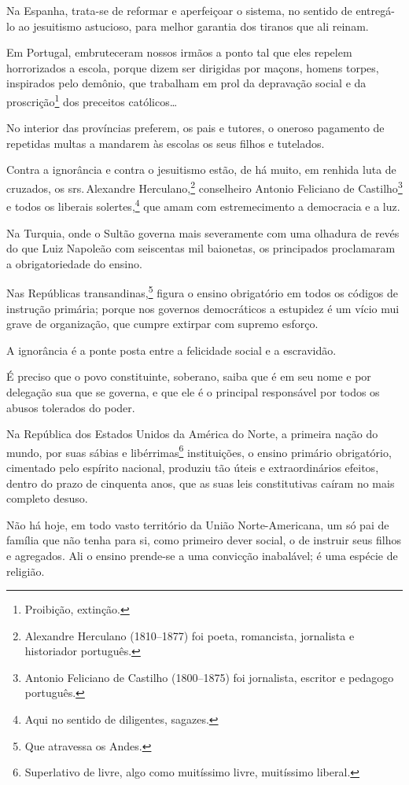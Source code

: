 Na Espanha, trata-se de reformar e aperfeiçoar o sistema, no sentido de
entregá-lo ao jesuitismo astucioso, para melhor garantia dos tiranos que
ali reinam.

Em Portugal, embruteceram nossos irmãos a ponto tal que eles repelem
horrorizados a escola, porque dizem ser dirigidas por maçons, homens
torpes, inspirados pelo demônio, que trabalham em prol da depravação
social e da proscrição\footnote{Proibição, extinção.} dos preceitos
católicos\ldots

No interior das províncias preferem, os pais e tutores, o oneroso
pagamento de repetidas multas a mandarem às escolas os seus filhos e
tutelados.

Contra a ignorância e contra o jesuitismo estão, de há muito, em renhida
luta de cruzados, os srs.\,Alexandre Herculano,\footnote{Alexandre
  Herculano (1810--1877) foi poeta, romancista, jornalista e historiador
  português.} conselheiro Antonio Feliciano de Castilho\footnote{
  Antonio Feliciano de Castilho (1800--1875) foi jornalista, escritor e
  pedagogo português.} e todos os liberais solertes,\footnote{Aqui no
  sentido de diligentes, sagazes.} que amam com estremecimento a
democracia e a luz.

Na Turquia, onde o Sultão governa mais severamente com uma olhadura de
revés do que Luiz Napoleão com seiscentas mil baionetas, os principados
proclamaram a obrigatoriedade do ensino.

Nas Repúblicas transandinas,\footnote{Que atravessa os Andes.} figura
o ensino obrigatório em todos os códigos de instrução primária; porque
nos governos democráticos a estupidez é um vício mui grave de
organização, que cumpre extirpar com supremo esforço.

A ignorância é a ponte posta entre a felicidade social e a escravidão.

É preciso que o povo constituinte, soberano, saiba que é em seu nome e
por delegação sua que se governa, e que ele é o principal responsável
por todos os abusos tolerados do poder.

Na República dos Estados Unidos da América do Norte, a primeira nação do
mundo, por suas sábias e libérrimas\footnote{Superlativo de livre,
  algo como muitíssimo livre, muitíssimo liberal.} instituições, o
ensino primário obrigatório, cimentado pelo espírito nacional, produziu
tão úteis e extraordinários efeitos, dentro do prazo de cinquenta anos,
que as suas leis constitutivas caíram no mais completo desuso.

Não há hoje, em todo vasto território da União Norte-Americana, um só
pai de família que não tenha para si, como primeiro dever social, o de
instruir seus filhos e agregados. Ali o ensino prende-se a uma convicção
inabalável; é uma espécie de religião.

